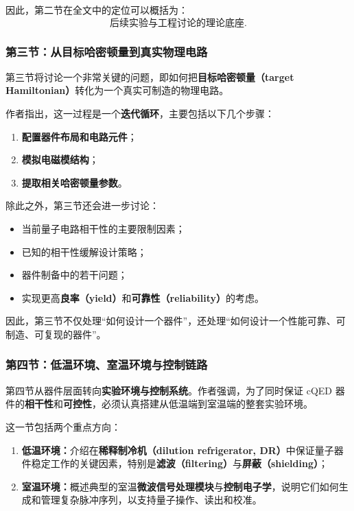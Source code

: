 \documentclass[12pt,a4paper,oneside]{ctexbook}
\begin{document}
因此，第二节在全文中的定位可以概括为：
\[
\text{后续实验与工程讨论的理论底座}.
\]

\subsubsection{第三节：从目标哈密顿量到真实物理电路}

第三节将讨论一个非常关键的问题，即如何把\textbf{目标哈密顿量（target Hamiltonian）}转化为一个真实可制造的物理电路。

作者指出，这一过程是一个\textbf{迭代循环}，主要包括以下几个步骤：
\begin{enumerate}[leftmargin=2em]
    \item \textbf{配置器件布局和电路元件}；
    \item \textbf{模拟电磁模结构}；
    \item \textbf{提取相关哈密顿量参数}。
\end{enumerate}

除此之外，第三节还会进一步讨论：
\begin{itemize}[leftmargin=2em]
    \item 当前量子电路相干性的主要限制因素；
    \item 已知的相干性缓解设计策略；
    \item 器件制备中的若干问题；
    \item 实现更高\textbf{良率（yield）}和\textbf{可靠性（reliability）}的考虑。
\end{itemize}

因此，第三节不仅处理“如何设计一个器件”，还处理“如何设计一个性能可靠、可制造、可复现的器件”。

\subsubsection{第四节：低温环境、室温环境与控制链路}

第四节从器件层面转向\textbf{实验环境与控制系统}。作者强调，为了同时保证 cQED 器件的\textbf{相干性}和\textbf{可控性}，必须认真搭建从低温端到室温端的整套实验环境。

这一节包括两个重点方向：

\begin{enumerate}[leftmargin=2em]
    \item \textbf{低温环境：}介绍在\textbf{稀释制冷机（dilution refrigerator, DR）}中保证量子器件稳定工作的关键因素，特别是\textbf{滤波（filtering）}与\textbf{屏蔽（shielding）}；
    \item \textbf{室温环境：}概述典型的室温\textbf{微波信号处理模块}与\textbf{控制电子学}，说明它们如何生成和管理复杂脉冲序列，以支持量子操作、读出和校准。
\end{enumerate}
\end{document}
